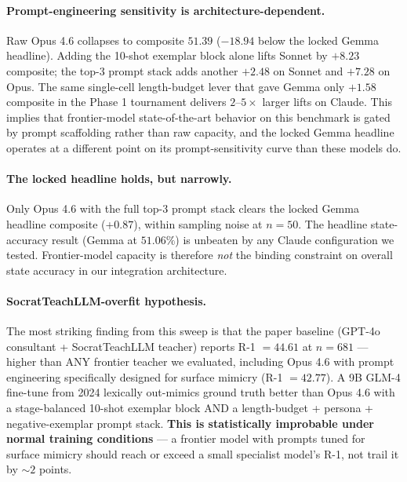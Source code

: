 \documentclass[11pt]{article}
\begin{document}
\paragraph{Prompt-engineering sensitivity is architecture-dependent.} Raw Opus 4.6 collapses to composite $51.39$ ($-18.94$ below the locked Gemma headline). Adding the 10-shot exemplar block alone lifts Sonnet by $+8.23$ composite; the top-3 prompt stack adds another $+2.48$ on Sonnet and $+7.28$ on Opus. The same single-cell length-budget lever that gave Gemma only $+1.58$ composite in the Phase 1 tournament delivers $2$--$5\times$ larger lifts on Claude. This implies that frontier-model state-of-the-art behavior on this benchmark is gated by prompt scaffolding rather than raw capacity, and the locked Gemma headline operates at a different point on its prompt-sensitivity curve than these models do.

\paragraph{The locked headline holds, but narrowly.} Only Opus 4.6 with the full top-3 prompt stack clears the locked Gemma headline composite (+$0.87$), within sampling noise at $n{=}50$. The headline state-accuracy result (Gemma at $51.06\%$) is unbeaten by any Claude configuration we tested. Frontier-model capacity is therefore \emph{not} the binding constraint on overall state accuracy in our integration architecture.

\paragraph{SocratTeachLLM-overfit hypothesis.} The most striking finding from this sweep is that the paper baseline (GPT-4o consultant + SocratTeachLLM teacher) reports R-1 $=44.61$ at $n{=}681$ --- higher than ANY frontier teacher we evaluated, including Opus 4.6 with prompt engineering specifically designed for surface mimicry (R-1 $=42.77$). A 9B GLM-4 fine-tune from 2024 lexically out-mimics ground truth better than Opus 4.6 with a stage-balanced 10-shot exemplar block AND a length-budget + persona + negative-exemplar prompt stack. \textbf{This is statistically improbable under normal training conditions} --- a frontier model with prompts tuned for surface mimicry should reach or exceed a small specialist model's R-1, not trail it by $\sim 2$ points.
\end{document}
